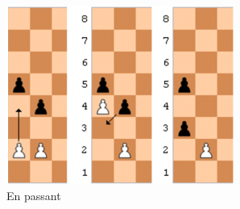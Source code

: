 \documentclass{article}
\begin{document}
\begin{figure}[!htb]
%
    \includegraphics[width=\linewidth]{chess10}
    \caption{En passant}\label{fig:chess8}
\endminipage
\end{figure}
\end{document}
